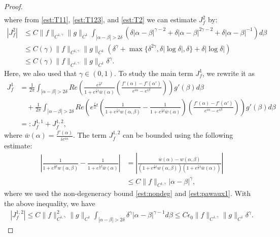 \documentclass[10pt,a4paper]{amsart}
\newcommand{\eps}{\epsilon}
\begin{document}
\begin{proof}
\begin{align*}
    \end{align*}
    where from \eqref{est:T11}, \eqref{est:T123}, and \eqref{est:T2} we can estimate $J_f^2$ by:
    \begin{equation}
        \label{est:Jf2}
        \begin{aligned}
            |J_f^2| &\le C\|f\|_{C^{1,\gamma}}\|g\|_{C^1}\int_{|\alpha - \beta| > 2\delta} \left(\delta |\alpha - \beta|^{\gamma-2} + \delta |\alpha - \beta|^{2\gamma-2} + \delta |\alpha - \beta|^{-1}\right) d\beta\\
            &\le C(\gamma)\|f\|_{C^{1,\gamma}}\|g\|_{C^1}(\delta^\gamma + \max\{\delta^{2\gamma},\delta|\log\delta|, \delta\} + \delta |\log \delta|)\\
            &\le C(\gamma)\|f\|_{C^{1,\gamma}}\|g\|_{C^1}\delta^\gamma.
        \end{aligned}
    \end{equation}
    Here, we also used that $\gamma \in (0,1).$ To study the main term $J_f^1$, we rewrite it as
    \begin{align*}
        J_f^1 &= \frac{1}{2\pi}\int_{|\alpha - \beta| > 2\delta} Re\left(\frac{e^{\frac{i}{2}t}}{1+ e^{\frac{i}{2}t}\bar{w}(\alpha)}\left(\frac{f'(\alpha) - f'(\alpha')}{e^{i\alpha} - e^{i\beta}}\right)\right)g'(\beta) d\beta\\
        &\quad + \frac{1}{2\pi}\int_{|\alpha - \beta| > 2\delta} Re\left(e^{\frac{i}{2}t}\left(\frac{1}{1+ e^{\frac{i}{2}t}w(\alpha,\beta)} - \frac{1}{1+ e^{\frac{i}{2}t}\bar{w}(\alpha)}\right)\left(\frac{f'(\alpha) - f'(\alpha')}{e^{i\alpha} - e^{i\beta}}\right)\right)g'(\beta) d\beta\\
        &=: J_f^{1,1} + J_f^{1,2},
    \end{align*}
    where $\bar{w}(\alpha) = \frac{f'(\alpha)}{ie^{i\alpha}}$. The term $J_{f}^{1,2}$ can be bounded using the following estimate:
    \begin{align*}
        \left|\frac{1}{1+ e^{\frac{i}{2}t}w(\alpha,\beta)} - \frac{1}{1+ e^{\frac{i}{2}t}\bar{w}(\alpha)}\right| &= \left|\frac{\bar w(\alpha) - w(\alpha,\beta)}{(1+ e^{\frac{i}{2}t}w(\alpha,\beta))(1+ e^{\frac{i}{2}t}\bar{w}(\alpha))}\right|\\
        &\le C\|f\|_{C^{1,\gamma}} |\alpha - \beta|^\gamma,
    \end{align*}
    where we used the non-degeneracy bound \eqref{est:nondeg} and \eqref{est:pawaux1}. With the above inequality, we have
    \begin{align*}
        |J_f^{1,2}| \le C\|f\|_{C^{1,\gamma}}^2\|g\|_{C^1}\int_{|\alpha - \beta| > 2\delta} \delta^\gamma|\alpha - \beta|^{\gamma - 1} d\beta \le C\eps_0\|f\|_{C^{1,\gamma}}\|g\|_{C^1}\delta^\gamma.

\end{align*}
\end{proof}
\end{document}
